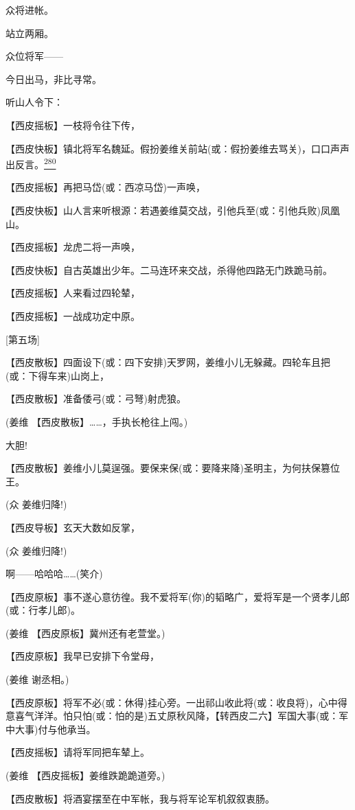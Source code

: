 众将进帐。

站立两厢。

众位将军------

今日出马，非比寻常。

听山人令下：

【西皮摇板】一枝将令往下传，

【西皮快板】镇北将军名魏延。假扮姜维关前站(或：假扮姜维去骂关)，口口声声出反言。\protect\hyperlink{fn280}{\textsuperscript{280}}

【西皮摇板】再把马岱(或：西凉马岱)一声唤，

【西皮快板】山人言来听根源：若遇姜维莫交战，引他兵至(或：引他兵败)凤凰山。

【西皮摇板】龙虎二将一声唤，

【西皮快板】自古英雄出少年。二马连环来交战，杀得他四路无门跌跪马前。

【西皮摇板】人来看过四轮辇，

【西皮摇板】一战成功定中原。

{[}第五场{]}

【西皮散板】四面设下(或：四下安排)天罗网，姜维小儿无躲藏。四轮车且把(或：下得车来)山岗上，

【西皮散板】准备倭弓(或：弓弩)射虎狼。

(姜维 【西皮散板】\ldots{}\ldots{}，手执长枪往上闯。)

大胆!

【西皮散板】姜维小儿莫逞强。要保来保(或：要降来降)圣明主，为何扶保篡位王。

(众 姜维归降!)

【西皮导板】玄天大数如反掌，

(众 姜维归降!)

啊------哈哈哈\ldots{}\ldots{}(笑介)

【西皮原板】事不遂心意彷徨。我不爱将军(你)的韬略广，爱将军是一个贤孝儿郎(或：行孝儿郎)。

(姜维 【西皮原板】冀州还有老萱堂。)

【西皮原板】我早已安排下令堂母，

(姜维 谢丞相。)

【西皮原板】将军不必(或：休得)挂心旁。一出祁山收此将(或：收良将)，心中得意喜气洋洋。怕只怕(或：怕的是)五丈原秋风降，【转西皮二六】军国大事(或：军中大事)付与他承当。

【西皮摇板】请将军同把车辇上。

(姜维 【西皮摇板】姜维跌跪跪道旁。)

【西皮散板】将酒宴摆至在中军帐，我与将军论军机叙叙衷肠。

